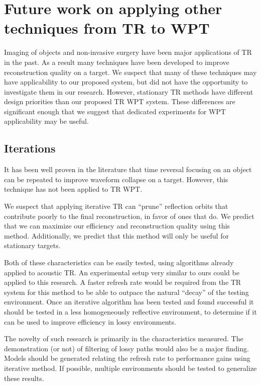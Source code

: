 \section{Future work on applying other techniques from TR to WPT}
\label{sec:future-tr}
Imaging of objects and non-invasive surgery have been major applications of TR in the past.
As a result  many techniques have been developed to improve reconstruction quality on a target.
We suspect that many of these techniques may have applicability to our proposed system, but did not
have the opportunity to investigate them in our research.
However, stationary TR methods have different design priorities than our proposed TR WPT system.
These differences are significant enough that we suggest that dedicated experiments for WPT applicability may be useful.

\subsection{Iterations}

It has been well proven in the literature that time reversal focusing on an object can be repeated to improve
waveform collapse on a target.   However, this technique has not been applied to TR WPT.

We suspect that applying iterative TR can ``prune'' reflection orbits that contribute poorly to the final reconstruction, in favor of ones that do. We predict that we can maximize our efficiency and reconstruction quality using this method. Additionally, we predict that this method will only be useful for stationary targets.

Both of these characteristics can be easily tested, using algorithms already applied to acoustic TR. An experimental setup very similar to ours could be applied to this research. A faster refresh rate  would be required from the TR system for this method to be able to outpace the natural ``decay'' of the testing environment. Once an iterative algorithm has been tested and found successful it should be tested in a less homogeneously reflective environment, to determine if it can be used to improve efficiency in lossy environments.

The novelty of such research is primarily in the characteristics measured. The demonstration (or not) of filtering of lossy paths would also be a major finding. Models should be generated relating the refresh rate  to performance gains using iterative method. If possible, multiple environments should be tested to generalize these results.

